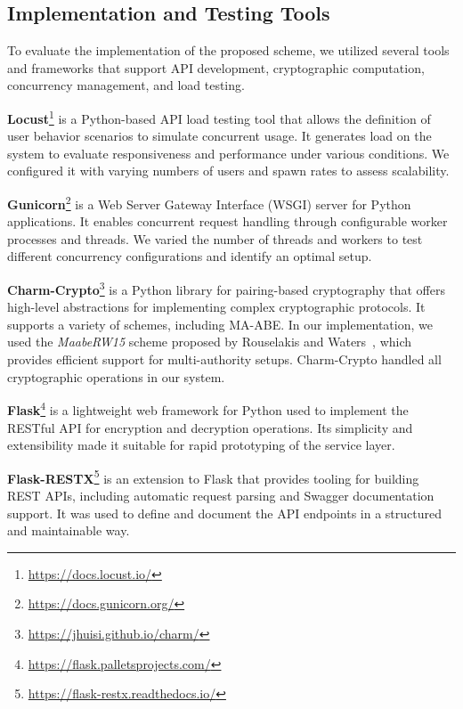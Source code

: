 \documentclass[cic,tc,english]{iiufrgs}
\numberwithin{algorithm}{chapter}
\begin{document}
        \subsection{Implementation and Testing Tools}
        \label{subsec:tools}

            To evaluate the implementation of the proposed scheme, we utilized several tools and frameworks that support API development, cryptographic computation, concurrency management, and load testing.

            \textbf{Locust}\footnote{\url{https://docs.locust.io/}} is a Python-based API load testing tool that allows the definition of user behavior scenarios to simulate concurrent usage. It generates load on the system to evaluate responsiveness and performance under various conditions. We configured it with varying numbers of users and spawn rates to assess scalability.

            \textbf{Gunicorn}\footnote{\url{https://docs.gunicorn.org/}} is a Web Server Gateway Interface (WSGI) server for Python applications. It enables concurrent request handling through configurable worker processes and threads. We varied the number of threads and workers to test different concurrency configurations and identify an optimal setup.

            \textbf{Charm-Crypto}\footnote{\url{https://jhuisi.github.io/charm/}} is a Python library for pairing-based cryptography that offers high-level abstractions for implementing complex cryptographic protocols. It supports a variety of schemes, including MA-ABE. In our implementation, we used the \emph{MaabeRW15} scheme proposed by Rouselakis and Waters~\citep{rouselakis2015efficient}, which provides efficient support for multi-authority setups. Charm-Crypto handled all cryptographic operations in our system.

            \textbf{Flask}\footnote{\url{https://flask.palletsprojects.com/}} is a lightweight web framework for Python used to implement the RESTful API for encryption and decryption operations. Its simplicity and extensibility made it suitable for rapid prototyping of the service layer.

            \textbf{Flask-RESTX}\footnote{\url{https://flask-restx.readthedocs.io/}} is an extension to Flask that provides tooling for building REST APIs, including automatic request parsing and Swagger documentation support. It was used to define and document the API endpoints in a structured and maintainable way.
\end{document}
